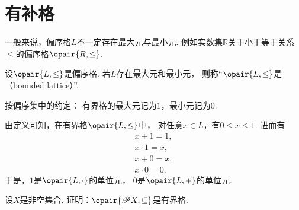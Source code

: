 \section{有补格}
一般来说，偏序格\(L\)不一定存在最大元与最小元.
例如实数集\(\mathbb{R}\)关于小于等于关系\(\leq\)的偏序格\(\opair{R,\leq}\).

\begin{definition}
设\(\opair{L,\leq}\)是偏序格.
若\(L\)存在最大元和最小元，
则称“\(\opair{L,\leq}\)是（bounded lattice）”.
\end{definition}

按偏序集中的约定：
有界格的最大元记为\(1\)，最小元记为\(0\).

由定义可知，在有界格\(\opair{L,\leq}\)中，
对任意\(x \in L\)，有\(0 \leq x \leq 1\).
进而有\begin{gather*}
	x + 1 = 1, \\
	x \cdot 1 = x, \\
	x + 0 = x, \\
	x \cdot 0 = 0.
\end{gather*}
于是，\(1\)是\(\opair{L,\cdot}\)的单位元，
\(0\)是\(\opair{L,+}\)的单位元.

\begin{example}
设\(X\)是非空集合.
证明：\(\opair{\Powerset X,\subseteq}\)是有界格.
\end{example}
